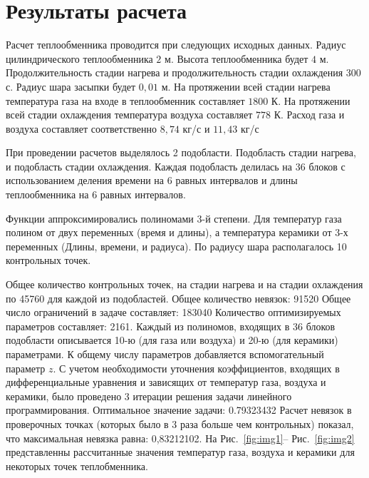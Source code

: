 \documentclass[a4paper,12pt]{article}
\begin{document}
\section{Результаты расчета}

Расчет теплообменника проводится при следующих исходных данных. Радиус
цилиндрического теплообменника $2$ м. Высота теплообменника будет $4$ м.
Продолжительность стадии нагрева и продолжительность стадии охлаждения
$300$ с. Радиус шара засыпки будет $0,01$ м. На протяжении всей стадии
нагрева температура газа на входе в теплообменник составляет $1800$ К.
На протяжении всей стадии охлаждения температура воздуха составляет
$778$ К. Расход газа и воздуха составляет соответственно $8,74$ кг/с и
$11,43$ кг/с

При проведении расчетов выделялось 2 подобласти. Подобласть стадии
нагрева, и подобласть стадии охлаждения. Каждая подобласть делилась на
36 блоков с использованием деления времени на 6 равных интервалов и
длины теплообменника на 6 равных интервалов.

Функции аппроксимировались полиномами 3-й степени. Для температур газа
полином от двух переменных (время и длины), а температура керамики от
3-х переменных (Длины, времени, и радиуса). По радиусу шара
располагалось 10 контрольных точек.

Общее количество контрольных точек, на стадии нагрева и на стадии
охлаждения по 45760 для каждой из подобластей. Общее количество
невязок: 91520 Общее число ограничений в задаче составляет: 183040
Количество оптимизируемых параметров составляет: 2161. Каждый из
полиномов, входящих в 36 блоков подобласти описывается 10-ю (для газа
или воздуха) и 20-ю (для керамики) параметрами. К общему числу
параметров добавляется вспомогательный параметр $z$. С учетом
необходимости уточнения коэффициентов, входящих в дифференциальные
уравнения и зависящих от температур газа, воздуха и керамики, было
проведено 3 итерации решения задачи линейного программирования.
Оптимальное значение задачи: 0.79323432 Расчет невязок в проверочных
точках (которых было в 3 раза больше чем контрольных) показал, что
максимальная невязка равна: 0,83212102. На Рис.~\ref{fig:img1}--
Рис.~\ref{fig:img2} представленны рассчитанные значения температур газа,
воздуха и керамики для некоторых точек теплобменника.
\end{document}
